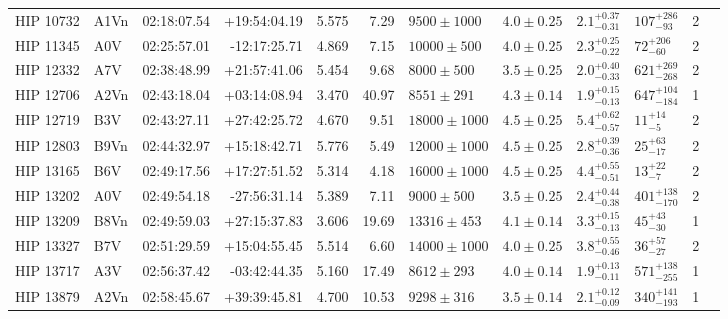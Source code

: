 \begin{tiny}
\begin{longtable}{|l|lrrrrllllll|}
   HIP 10732 &     A1Vn &    02:18:07.54 &   +19:54:04.19 &   5.575 &      7.29 &   $9500 \pm 1000$ &  $4.0 \pm 0.25$ &  $2.1^{+0.37}_{-0.31}$ &    $107^{+286}_{-93}$ &       2 \\
   HIP 11345 &      A0V &    02:25:57.01 &   -12:17:25.71 &   4.869 &      7.15 &   $10000 \pm 500$ &  $4.0 \pm 0.25$ &  $2.3^{+0.25}_{-0.22}$ &     $72^{+206}_{-60}$ &       2 \\
   HIP 12332 &      A7V &    02:38:48.99 &   +21:57:41.06 &   5.454 &      9.68 &    $8000 \pm 500$ &  $3.5 \pm 0.25$ &  $2.0^{+0.40}_{-0.33}$ &   $621^{+269}_{-268}$ &       2 \\
   HIP 12706 &     A2Vn &    02:43:18.04 &   +03:14:08.94 &   3.470 &     40.97 &    $8551 \pm 291$ &  $4.3 \pm 0.14$ &  $1.9^{+0.15}_{-0.13}$ &   $647^{+104}_{-184}$ &       1 \\
   HIP 12719 &      B3V &    02:43:27.11 &   +27:42:25.72 &   4.670 &      9.51 &  $18000 \pm 1000$ &  $4.5 \pm 0.25$ &  $5.4^{+0.62}_{-0.57}$ &       $11^{+14}_{-5}$ &       2 \\
   HIP 12803 &     B9Vn &    02:44:32.97 &   +15:18:42.71 &   5.776 &      5.49 &  $12000 \pm 1000$ &  $4.5 \pm 0.25$ &  $2.8^{+0.39}_{-0.36}$ &      $25^{+63}_{-17}$ &       2 \\
   HIP 13165 &      B6V &    02:49:17.56 &   +17:27:51.52 &   5.314 &      4.18 &  $16000 \pm 1000$ &  $4.5 \pm 0.25$ &  $4.4^{+0.55}_{-0.51}$ &       $13^{+22}_{-7}$ &       2 \\
   HIP 13202 &      A0V &    02:49:54.18 &   -27:56:31.14 &   5.389 &      7.11 &    $9000 \pm 500$ &  $3.5 \pm 0.25$ &  $2.4^{+0.44}_{-0.38}$ &   $401^{+138}_{-170}$ &       2 \\
   HIP 13209 &     B8Vn &    02:49:59.03 &   +27:15:37.83 &   3.606 &     19.69 &   $13316 \pm 453$ &  $4.1 \pm 0.14$ &  $3.3^{+0.15}_{-0.13}$ &      $45^{+43}_{-30}$ &       1 \\
   HIP 13327 &      B7V &    02:51:29.59 &   +15:04:55.45 &   5.514 &      6.60 &  $14000 \pm 1000$ &  $4.0 \pm 0.25$ &  $3.8^{+0.55}_{-0.46}$ &      $36^{+57}_{-27}$ &       2 \\
   HIP 13717 &      A3V &    02:56:37.42 &   -03:42:44.35 &   5.160 &     17.49 &    $8612 \pm 293$ &  $4.0 \pm 0.14$ &  $1.9^{+0.13}_{-0.11}$ &   $571^{+138}_{-255}$ &       1 \\
   HIP 13879 &     A2Vn &    02:58:45.67 &   +39:39:45.81 &   4.700 &     10.53 &    $9298 \pm 316$ &  $3.5 \pm 0.14$ &  $2.1^{+0.12}_{-0.09}$ &   $340^{+141}_{-193}$ &       1 \\

\end{longtable}
\end{tiny}
